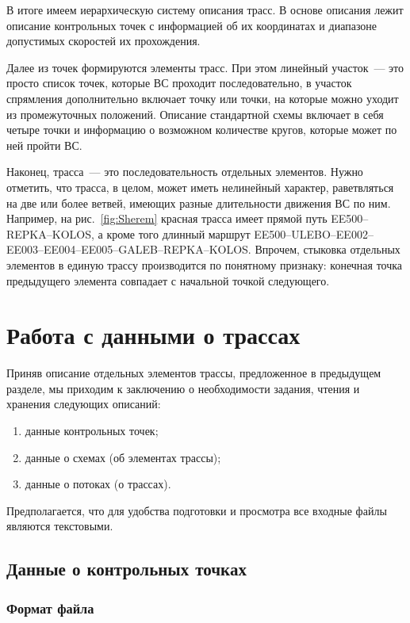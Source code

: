 \documentclass[12pt]{article}
\theoremstyle{plain}
\begin{document}
В итоге имеем иерархическую систему описания трасс. В основе описания лежит описание контрольных точек с информацией об их координатах и диапазоне допустимых скоростей их прохождения. 

Далее из точек формируются элементы трасс. При этом линейный участок~--- это просто список точек, которые ВС проходит последовательно, в участок спрямления дополнительно включает точку или точки, на которые можно уходит из промежуточных положений. Описание стандартной схемы включает в себя четыре точки и информацию о возможном количестве кругов, которые может по ней пройти ВС. 

Наконец, трасса~--- это последовательность отдельных элементов. Нужно отметить, что трасса, в целом, может иметь нелинейный характер, раветвляться на две или более ветвей, имеющих разные длительности движения ВС по ним. Например, на рис.~\ref{fig:Sherem} красная трасса имеет прямой путь EE500--REPKA--KOLOS, а кроме того длинный маршрут EE500--ULEBO--EE002--EE003--EE004--EE005--GALEB--REPKA--KOLOS. Впрочем, стыковка отдельных элементов в единую трассу производится по понятному признаку: конечная точка предыдущего элемента совпадает с начальной точкой следующего. 



\section{Работа с данными о трассах}

Приняв описание отдельных элементов трассы, предложенное в предыдущем разделе, мы приходим к заключению о необходимости задания, чтения и хранения следующих описаний:
\begin{enumerate}
  \item данные контрольных точек;
  \item данные о схемах (об элементах трассы);
  \item данные о потоках (о трассах).
\end{enumerate}

Предполагается, что для удобства подготовки и просмотра все входные файлы являются текстовыми.


\subsection{Данные о контрольных точках}

\subsubsection{Формат файла}
\end{document}
